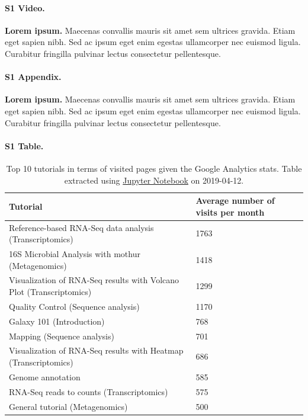 \documentclass[10pt,letterpaper]{article}
\begin{document}
\paragraph*{S1 Video.}
\label{S1_Video}
{\bf Lorem ipsum.}  Maecenas convallis mauris sit amet sem ultrices gravida. Etiam eget sapien nibh. Sed ac ipsum eget enim egestas ullamcorper nec euismod ligula. Curabitur fringilla pulvinar lectus consectetur pellentesque.

\paragraph*{S1 Appendix.}
\label{S1_Appendix}
{\bf Lorem ipsum.} Maecenas convallis mauris sit amet sem ultrices gravida. Etiam eget sapien nibh. Sed ac ipsum eget enim egestas ullamcorper nec euismod ligula. Curabitur fringilla pulvinar lectus consectetur pellentesque.

\paragraph*{S1 Table.}
\label{S1_Table}
\begin{table}[]
\begin{adjustwidth}{-2.25in}{0in} %
	\centering
	\caption{Top 10 tutorials in terms of visited pages given the Google Analytics stats. Table extracted using \href{https://github.com/bebatut/galaxy-training-material-stats/blob/master/src/extract_repo_content_stats.ipynb}{Jupyter Notebook} on 2019-04-12.\label{tbl:topViewedTutorials}}
	\begin{tabular}{ll}
		Tutorial                                                             & Average number of visits per month \\\hline
		Reference-based RNA-Seq data analysis (Transcriptomics)              & 1763 \\
		16S Microbial Analysis with mothur (Metagenomics)                    & 1418 \\
		Visualization of RNA-Seq results with Volcano Plot (Transcriptomics) & 1299 \\
		Quality Control (Sequence analysis)                                  & 1170 \\
		Galaxy 101 (Introduction)                                            & 768 \\
		Mapping (Sequence analysis)                                          & 701 \\
		Visualization of RNA-Seq results with Heatmap (Transcriptomics)      & 686 \\
		Genome annotation                                                    & 585 \\
		RNA-Seq reads to counts (Transcriptomics)                            & 575 \\
		General tutorial (Metagenomics)                                      & 500 \\
	\end{tabular}
\end{adjustwidth}
\end{table}
\end{document}
